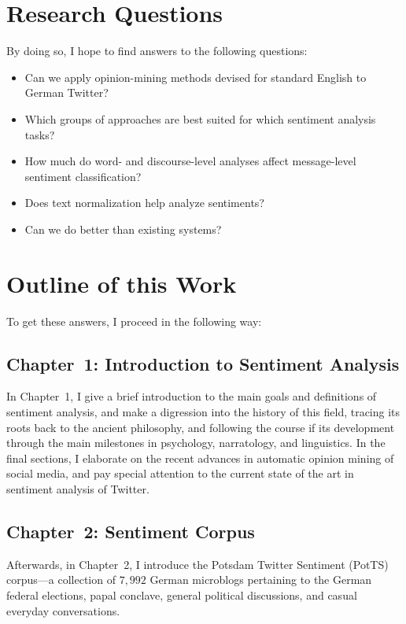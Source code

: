 \documentclass[11pt]{article}
\begin{document}
\section{Research Questions}

By doing so, I hope to find answers to the following questions:
\begin{itemize}
\item Can we apply opinion-mining methods devised for standard English
  to German Twitter?
\item Which groups of approaches are best suited for which sentiment
  analysis tasks?
\item How much do word- and discourse-level analyses affect
  message-level sentiment classification?
\item Does text normalization help analyze sentiments?
\item Can we do better than existing systems?
\end{itemize}

\section{Outline of this Work}

To get these answers, I proceed in the following way:

\subsection{Chapter~1: Introduction to Sentiment Analysis}

In Chapter~1, I give a brief introduction to the main goals and
definitions of sentiment analysis, and make a digression into the
history of this field, tracing its roots back to the ancient
philosophy, and following the course if its development through the
main milestones in psychology, narratology, and linguistics.  In the
final sections, I elaborate on the recent advances in automatic
opinion mining of social media, and pay special attention to the
current state of the art in sentiment analysis of Twitter.

\subsection{Chapter~2: Sentiment Corpus}

Afterwards, in Chapter~2, I introduce the Potsdam Twitter Sentiment
(PotTS) corpus---a collection of $7,992$ German microblogs pertaining
to the German federal elections, papal conclave, general political
discussions, and casual everyday conversations.
\end{document}
